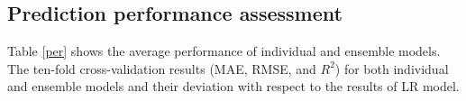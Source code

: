 \documentclass[11pt]{article}
\begin{document}
	
	\subsection{Prediction performance assessment}
	
	Table \ref{per} shows the average performance of individual and ensemble models. The ten-fold cross-validation results (MAE, RMSE, and $R^2$) for both individual and ensemble models and their deviation with respect to the results of LR model. 
\end{document}
